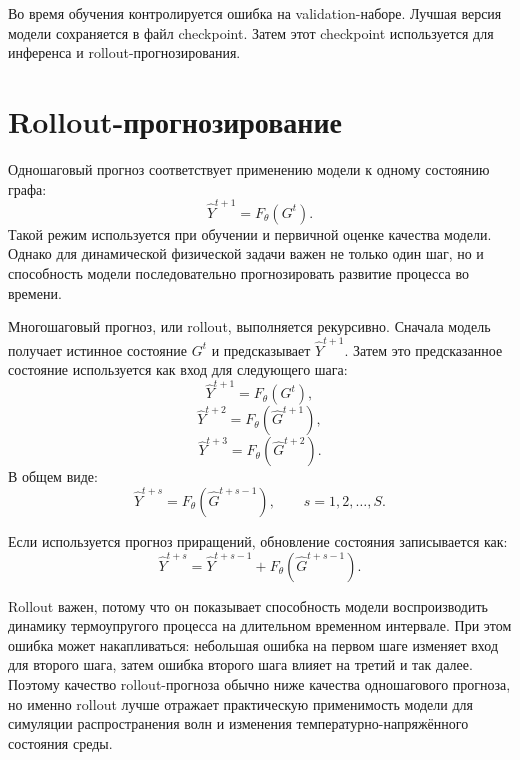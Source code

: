 Во время обучения контролируется ошибка на validation-наборе. Лучшая версия модели сохраняется в файл checkpoint. Затем этот checkpoint используется для инференса и rollout-прогнозирования.

\section{Rollout-прогнозирование}

Одношаговый прогноз соответствует применению модели к одному состоянию графа:
\begin{equation}
    \hat{Y}^{t+1}=F_{\theta}(G^t).
\end{equation}
Такой режим используется при обучении и первичной оценке качества модели. Однако для динамической физической задачи важен не только один шаг, но и способность модели последовательно прогнозировать развитие процесса во времени.

Многошаговый прогноз, или rollout, выполняется рекурсивно. Сначала модель получает истинное состояние $G^t$ и предсказывает $\hat{Y}^{t+1}$. Затем это предсказанное состояние используется как вход для следующего шага:
\begin{equation}
    \hat{Y}^{t+1}=F_{\theta}(G^t),
\end{equation}
\begin{equation}
    \hat{Y}^{t+2}=F_{\theta}(\hat{G}^{t+1}),
\end{equation}
\begin{equation}
    \hat{Y}^{t+3}=F_{\theta}(\hat{G}^{t+2}).
\end{equation}
В общем виде:
\begin{equation}
    \hat{Y}^{t+s}=F_{\theta}(\hat{G}^{t+s-1}), \qquad s=1,2,\dots,S.
\end{equation}

Если используется прогноз приращений, обновление состояния записывается как:
\begin{equation}
    \hat{Y}^{t+s}=\hat{Y}^{t+s-1}+F_{\theta}(\hat{G}^{t+s-1}).
\end{equation}

Rollout важен, потому что он показывает способность модели воспроизводить динамику термоупругого процесса на длительном временном интервале. При этом ошибка может накапливаться: небольшая ошибка на первом шаге изменяет вход для второго шага, затем ошибка второго шага влияет на третий и так далее. Поэтому качество rollout-прогноза обычно ниже качества одношагового прогноза, но именно rollout лучше отражает практическую применимость модели для симуляции распространения волн и изменения температурно-напряжённого состояния среды.

